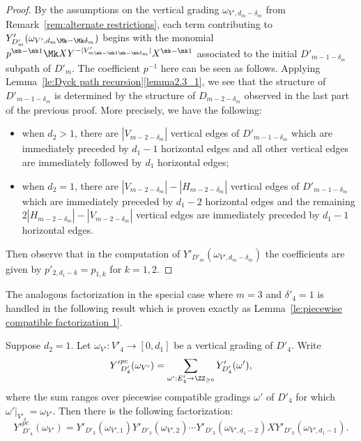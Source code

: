 \begin{proof}
 By the assumptions on the vertical grading $\omega_{V',d_m-\delta_m}$ from Remark~\ref{rem:alternate restrictions}, each term contributing to $Y'_{D'_m}(\omega_{V',d_m\Mk -\Mk \delta_m})$ begins with the monomial $p^{\mk -\mk 1}\Mk XY^{-|V'_{m\mk -\mk 1\mk -\mk \delta_m}|}X^{\mk -\mk 1}$ associated to the initial $D'_{m-1-\delta_m}$ subpath of $D'_m$.
 The coefficient $p^{-1}$ here can be seen as follows. 
 Applying Lemma~\ref{le:Dyck path recursion}\ref{lemma2.3_1}, we see that the structure of $D'_{m-1-\delta_m}$ is determined by the structure of $D_{m-2-\delta_m}$ observed in the last part of the previous proof.
 More precisely, we have the following:
 \begin{itemize}
 \item when $d_2>1$, there are $|V_{m-2-\delta_m}|$ vertical edges of $D'_{m-1-\delta_m}$ which are immediately preceded by $d_1-1$ horizontal edges and all other vertical edges are immediately followed by $d_1$ horizontal edges;
 \item when $d_2=1$, there are $|V_{m-2-\delta_m}|-|H_{m-2-\delta_m}|$ vertical edges of $D'_{m-1-\delta_m}$ which are immediately preceded by $d_1-2$ horizontal edges and the remaining $2|H_{m-2-\delta_m}|-|V_{m-2-\delta_m}|$ vertical edges are immediately preceded by $d_1-1$ horizontal edges.
 \end{itemize}
 Then observe that in the computation of $Y'_{D'_m}(\omega_{V',d_m-\delta_m})$ the coefficients are given by $p'_{2,d_1-k}=p_{1,k}$ for $k=1,2$.
\end{proof}

The analogous factorization in the special case where $m=3$ and $\delta'_4=1$ is handled in the following result which is proven exactly as Lemma~\ref{le:piecewise compatible factorization 1}.
\begin{lemma}
 \label{le:piecewise compatible factorization 3}
 Suppose $d_2=1$. Let $\omega_{V'}:V'_4\to[0,d_1]$ be a vertical grading of $D'_4$.
 Write 
 \[{Y'}_{D'_4}^{pc}(\omega_{V'})=\sum\limits_{\omega':E'_4\to\ZZ_{\ge0}} Y'_{D'_4}(\omega'),\]
 where the sum ranges over piecewise compatible gradings $\omega'$ of $D'_4$ for which $\omega'|_{V'_4}=\omega_{V'}$.
 Then there is the following factorization:
 \begin{equation}
 \label{eq:piecewise compatible factorization 3}
 {Y'}_{D'_4}^{pc}(\omega_{V'})=Y'_{D'_3}(\omega_{V',1})Y'_{D'_3}(\omega_{V',2})\cdots Y'_{D'_3}(\omega_{V',d_1-2})X Y'_{D'_3}(\omega_{V',d_1-1}).
 \end{equation}
\end{lemma}

